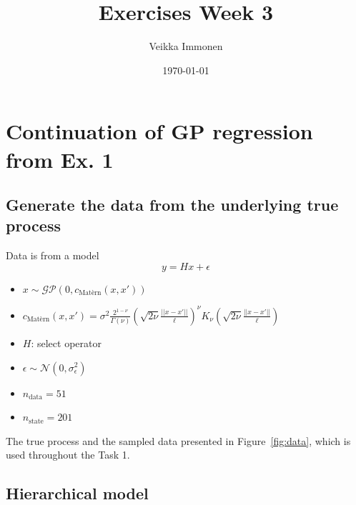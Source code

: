 \documentclass[times, a4paper, 12pt, onecolumn, oneside]{article}
\date{}
\title{ Exercises Week 3}
\author{Veikka Immonen}
\date{\today}
\begin{document}
\maketitle

\section{Continuation of GP regression from Ex. 1}

\subsection{Generate the data from the underlying true process}

Data is from a model
$$
y = Hx + \epsilon
$$
\begin{itemize}
\item $x \sim \mathcal{GP}(0, c_\text{Matèrn}(x, x'))$
\item $c_\text{Matèrn}(x, x') = \sigma^2 \frac{2^{1 - \nu}}{\Gamma(\nu)}\left(\sqrt{2\nu}\frac{||x - x'||}{\ell}\right)^\nu K_\nu\left(\sqrt{2\nu}\frac{||x - x'||}{\ell}\right)$
\item $H$: select operator
\item $\epsilon \sim \mathcal{N}(0, \sigma_\epsilon^2)$ 
\item $n_\text{data} = 51$
\item $n_\text{state} = 201$
\end{itemize}
The true process and the sampled data presented in Figure~\ref{fig:data}, which is used throughout the Task 1.

\subsection{Hierarchical model}
\end{document}
